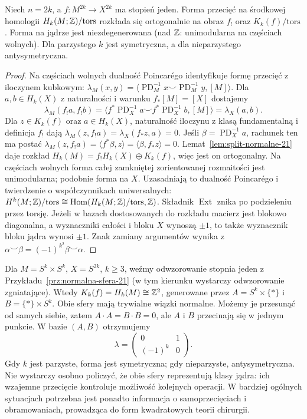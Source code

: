 \begin{stwierdzenie}
\label{prop:forma-jadra-21}
Niech $n=2k$, a $f:M^{2k}\to X^{2k}$ ma stopień
jeden. Forma przecięć na środkowej homologii
$H_k(M;\mathbb{Z})/\mathrm{tors}$ rozkłada się ortogonalnie
na obraz $f_!$ oraz $K_k(f)/\mathrm{tors}$.
Forma na jądrze jest niezdegenerowana
(nad $\mathbb{Z}$: unimodularna na częściach wolnych).
Dla parzystego $k$ jest symetryczna, a dla
nieparzystego antysymetryczna.
\end{stwierdzenie}
\begin{proof}
Na częściach wolnych dualność Poincarégo
identyfikuje formę przecięć z iloczynem kubkowym:
$\lambda_M(x,y)=\langle\operatorname{PD}_M^{-1}x
\smile\operatorname{PD}_M^{-1}y,[M]\rangle$.
Dla $a,b\in H_k(X)$ z naturalności i warunku
$f_*[M]=[X]$ dostajemy
\[
 \lambda_M(f_!a,f_!b)
 =\langle f^*\operatorname{PD}_X^{-1}a
 \smile f^*\operatorname{PD}_X^{-1}b,[M]\rangle
 =\lambda_X(a,b).
\]
Dla $z\in K_k(f)$ oraz $a\in H_k(X)$,
naturalność iloczynu z klasą fundamentalną
i definicja $f_!$ dają
$\lambda_M(z,f_!a)=\lambda_X(f_*z,a)=0$.
Jeśli $\beta=\operatorname{PD}_X^{-1}a$, rachunek ten
ma postać $\lambda_M(z,f_!a)=\langle f^*\beta,z\rangle
=\langle\beta,f_*z\rangle=0$.
Lemat~\ref{lem:split-normalne-21} daje rozkład
$H_k(M)=f_!H_k(X)\oplus K_k(f)$, więc jest
on ortogonalny. Na częściach wolnych forma
całej zamkniętej zorientowanej rozmaitości
jest unimodularna; podobnie forma na $X$.
Uzasadniają to dualność Poincarégo i twierdzenie
o współczynnikach uniwersalnych:
$H^k(M;\mathbb{Z})/\mathrm{tors}\cong
\operatorname{Hom}(H_k(M;\mathbb{Z})/\mathrm{tors},\mathbb{Z})$.
Składnik $\operatorname{Ext}$ znika po podzieleniu przez torsję.
Jeżeli w bazach dostosowanych do rozkładu
macierz jest blokowo diagonalna, a wyznaczniki
całości i bloku $X$ wynoszą $\pm1$, to także
wyznacznik bloku jądra wynosi $\pm1$.
Znak zamiany argumentów wynika z
$\alpha\smile\beta=(-1)^{k^2}\beta\smile\alpha$.
\end{proof}

\begin{przyklad}
\label{prz:forma-produkt-21}
Dla $M=S^k\times S^k$, $X=S^{2k}$, $k\geq3$,
weźmy odwzorowanie stopnia jeden z
Przykładu~\ref{prz:normalna-sfera-21}
(w tym kierunku wystarczy odwzorowanie zgniatające).
Wtedy $K_k(f)=H_k(M)\cong\mathbb{Z}^2$,
generowane przez
$A=S^k\times\{*\}$ i $B=\{*\}\times S^k$.
Obie sfery mają trywialne wiązki normalne.
Możemy je przesunąć od samych siebie, zatem
$A\cdot A=B\cdot B=0$, ale $A$ i $B$
przecinają się w jednym punkcie.
W bazie $(A,B)$ otrzymujemy
\[
 \lambda=\begin{pmatrix}0&1\\(-1)^k&0\end{pmatrix}.
\]
Gdy $k$ jest parzyste, forma jest symetryczna;
gdy nieparzyste, antysymetryczna.
Nie wystarczy osobno policzyć, że obie sfery
reprezentują klasy jądra: ich wzajemne
przecięcie kontroluje możliwość kolejnych
operacji. W bardziej ogólnych sytuacjach
potrzebna jest ponadto informacja o
samoprzecięciach i obramowaniach, prowadząca
do form kwadratowych teorii chirurgii.
\end{przyklad}

